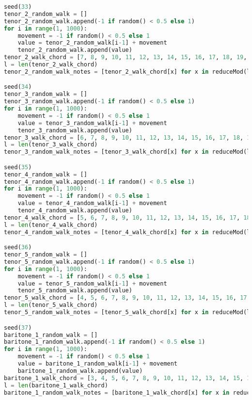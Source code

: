 \begin{lstlisting}[language=Python, caption=Invocation Source Code]
seed(33)
tenor_2_random_walk = []
tenor_2_random_walk.append(-1 if random() < 0.5 else 1)
for i in range(1, 1000):
    movement = -1 if random() < 0.5 else 1
    value = tenor_2_random_walk[i-1] + movement
    tenor_2_random_walk.append(value)
tenor_2_walk_chord = [7, 8, 9, 10, 11, 12, 13, 14, 15, 16, 17, 18, 19, 20, 21, 22, 21, 20, 19, 18, 17, 16, 15, 14, 13, 12, 11, 10, 9, 8, 7, 6, 5, 4, 3, 2, 1, 0, -1, -2, -1, 0, 1, 2, 3, 4, 5, 6, ]
l = len(tenor_2_walk_chord)
tenor_2_random_walk_notes = [tenor_2_walk_chord[x] for x in reduceMod(l, tenor_2_random_walk)]

seed(34)
tenor_3_random_walk = []
tenor_3_random_walk.append(-1 if random() < 0.5 else 1)
for i in range(1, 1000):
    movement = -1 if random() < 0.5 else 1
    value = tenor_3_random_walk[i-1] + movement
    tenor_3_random_walk.append(value)
tenor_3_walk_chord = [6, 7, 8, 9, 10, 11, 12, 13, 14, 15, 16, 17, 18, 19, 20, 21, 22, 21, 20, 19, 18, 17, 16, 15, 14, 13, 12, 11, 10, 9, 8, 7, 6, 5, 4, 3, 2, 1, 0, -1, -2, -1, 0, 1, 2, 3, 4, 5, ]
l = len(tenor_3_walk_chord)
tenor_3_random_walk_notes = [tenor_3_walk_chord[x] for x in reduceMod(l, tenor_3_random_walk)]

seed(35)
tenor_4_random_walk = []
tenor_4_random_walk.append(-1 if random() < 0.5 else 1)
for i in range(1, 1000):
    movement = -1 if random() < 0.5 else 1
    value = tenor_4_random_walk[i-1] + movement
    tenor_4_random_walk.append(value)
tenor_4_walk_chord = [5, 6, 7, 8, 9, 10, 11, 12, 13, 14, 15, 16, 17, 18, 19, 20, 21, 22, 21, 20, 19, 18, 17, 16, 15, 14, 13, 12, 11, 10, 9, 8, 7, 6, 5, 4, 3, 2, 1, 0, -1, -2, -1, 0, 1, 2, 3, 4, ]
l = len(tenor_4_walk_chord)
tenor_4_random_walk_notes = [tenor_4_walk_chord[x] for x in reduceMod(l, tenor_4_random_walk)]

seed(36)
tenor_5_random_walk = []
tenor_5_random_walk.append(-1 if random() < 0.5 else 1)
for i in range(1, 1000):
    movement = -1 if random() < 0.5 else 1
    value = tenor_5_random_walk[i-1] + movement
    tenor_5_random_walk.append(value)
tenor_5_walk_chord = [4, 5, 6, 7, 8, 9, 10, 11, 12, 13, 14, 15, 16, 17, 18, 19, 20, 21, 22, 21, 20, 19, 18, 17, 16, 15, 14, 13, 12, 11, 10, 9, 8, 7, 6, 5, 4, 3, 2, 1, 0, -1, -2, -1, 0, 1, 2, 3, ]
l = len(tenor_5_walk_chord)
tenor_5_random_walk_notes = [tenor_5_walk_chord[x] for x in reduceMod(l, tenor_5_random_walk)]

seed(37)
baritone_1_random_walk = []
baritone_1_random_walk.append(-1 if random() < 0.5 else 1)
for i in range(1, 1000):
    movement = -1 if random() < 0.5 else 1
    value = baritone_1_random_walk[i-1] + movement
    baritone_1_random_walk.append(value)
baritone_1_walk_chord = [3, 4, 5, 6, 7, 8, 9, 10, 11, 12, 13, 14, 15, 16, 17, 18, 19, 20, 21, 22, 21, 20, 19, 18, 17, 16, 15, 14, 13, 12, 11, 10, 9, 8, 7, 6, 5, 4, 3, 2, 1, 0, -1, -2, -1, 0, 1, 2, ]
l = len(baritone_1_walk_chord)
baritone_1_random_walk_notes = [baritone_1_walk_chord[x] for x in reduceMod(l, baritone_1_random_walk)]


\end{lstlisting}
